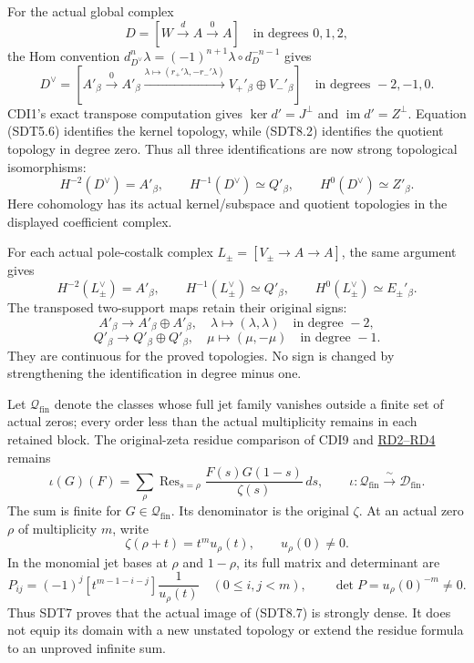 For the actual global complex \[
D=[W\xrightarrow d A\xrightarrow0 A]
\quad\text{in degrees }0,1,2,
\] the Hom convention
\(d_{D^\vee}^n\lambda=(-1)^{n+1}\lambda\circ d_D^{-n-1}\) gives \[
D^\vee=[A'_\beta\xrightarrow0 A'_\beta
\xrightarrow{\lambda\mapsto(r_+'\lambda,-r_-'\lambda)}
V_+'{}_\beta\oplus V_-'{}_\beta]
\quad\text{in degrees }-2,-1,0.
\tag{SDT8.3}
\] CDI1's exact transpose computation gives \(\ker d'=J^\perp\) and
\(\operatorname{im}d'=Z^\perp\). Equation (SDT5.6) identifies the kernel
topology, while (SDT8.2) identifies the quotient topology in degree
zero. Thus all three identifications are now strong topological
isomorphisms: \[
\boxed{
H^{-2}(D^\vee)=A'_\beta,\qquad
H^{-1}(D^\vee)\simeq Q'_\beta,\qquad
H^0(D^\vee)\simeq Z'_\beta.}
\tag{SDT8.4}
\] Here cohomology has its actual kernel/subspace and quotient
topologies in the displayed coefficient complex.

For each actual pole-costalk complex \(L_\pm=[V_\pm\to A\to A]\), the
same argument gives \[
\boxed{
H^{-2}(L_\pm^\vee)=A'_\beta,\qquad
H^{-1}(L_\pm^\vee)\simeq Q'_\beta,\qquad
H^0(L_\pm^\vee)\simeq E_\pm'{}_\beta.}
\tag{SDT8.5}
\] The transposed two-support maps retain their original signs: \[
A'_\beta\longrightarrow A'_\beta\oplus A'_\beta,\quad
\lambda\longmapsto(\lambda,\lambda)
\quad\text{in degree }-2,
\] \[
Q'_\beta\longrightarrow Q'_\beta\oplus Q'_\beta,\quad
\mu\longmapsto(\mu,-\mu)
\quad\text{in degree }-1.
\tag{SDT8.6}
\] They are continuous for the proved topologies. No sign is changed by
strengthening the identification in degree minus one.

Let \(\mathcal Q_{\mathrm{fin}}\) denote the classes whose full jet
family vanishes outside a finite set of actual zeros; every order less
than the actual multiplicity remains in each retained block. The
original-zeta residue comparison of CDI9 and
\href{https://github.com/KokunoYumeto/zeta-function-research-reader/blob/main/workbenches/splitzero-tandem/continuations/20260925-source-endpoint-and-section/ORIGINAL_ZETA_RESIDUE_DUAL_AND_SUPPORT_MAPS.md}{RD2--RD4}
remains \[
\iota(G)(F)=\sum_\rho\operatorname{Res}_{s=\rho}
\frac{F(s)G(1-s)}{\zeta(s)}\,ds,
\qquad
\iota:\mathcal Q_{\mathrm{fin}}\xrightarrow{\ \sim\ }
\mathscr D_{\mathrm{fin}}.
\tag{SDT8.7}
\] The sum is finite for \(G\in\mathcal Q_{\mathrm{fin}}\). Its
denominator is the original \(\zeta\). At an actual zero \(\rho\) of
multiplicity \(m\), write \[
\zeta(\rho+t)=t^m u_\rho(t),\qquad u_\rho(0)\ne0.
\] In the monomial jet bases at \(\rho\) and \(1-\rho\), its full matrix
and determinant are \[
P_{ij}=(-1)^j[t^{m-1-i-j}]\frac1{u_\rho(t)}
\quad(0\le i,j<m),\qquad
\det P=u_\rho(0)^{-m}\ne0.
\tag{SDT8.8}
\] Thus SDT7 proves that the actual image of (SDT8.7) is strongly dense.
It does not equip its domain with a new unstated topology or extend the
residue formula to an unproved infinite sum.

